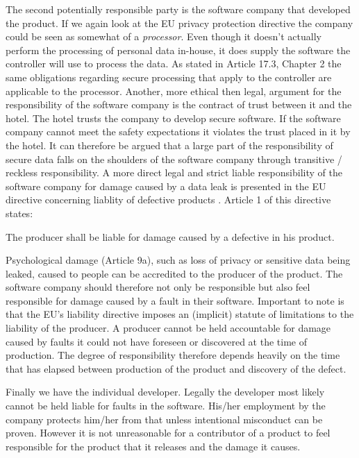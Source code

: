 The second potentially responsible party is the software company that developed the product. If we again look at the EU privacy protection directive \cite{privacy_directive} the company could be seen as somewhat of a  \textit{processor}. Even though it doesn't actually perform the processing of personal data in-house, it does supply the software the controller will use to process the data. As stated in Article 17.3, Chapter 2 the same obligations regarding secure processing that apply to the controller are applicable to the processor. Another, more ethical then legal, argument for the responsibility of the software company is the contract of trust between it and the hotel. The hotel trusts the company to develop secure software. If the software company cannot meet the safety expectations it violates the trust placed in it by the hotel. It can therefore be argued that a large part of the responsibility of secure data falls on the shoulders of the software company through transitive / reckless responsibility. A more direct legal and strict liable responsibility of the software company for damage caused by a data leak is presented in the EU directive concerning liablity of defective products \cite{liability_directive}. Article 1 of this directive states:

\begin{displayquote}The producer shall be liable for damage caused by a defective in his product.\end{displayquote}

Psychological damage (Article 9a), such as loss of privacy or sensitive data being leaked, caused to people can be accredited to the producer of the product. The software company should therefore not only be responsible but also feel responsible for damage caused by a fault in their software.
Important to note is that the EU's liability directive \cite{liability_directive} imposes an (implicit) statute of limitations to the liability of the producer. A producer cannot be held accountable for damage caused by faults it could not have foreseen or discovered at the time of production. The degree of responsibility therefore depends heavily on the time that has elapsed between production of the product and discovery of the defect.

Finally we have the individual developer. Legally the developer most likely cannot be held liable for faults in the software. His/her employment by the company protects him/her from that unless intentional misconduct can be proven. However it is not unreasonable for a contributor of a product to feel responsible for the product that it releases and the damage it causes.

